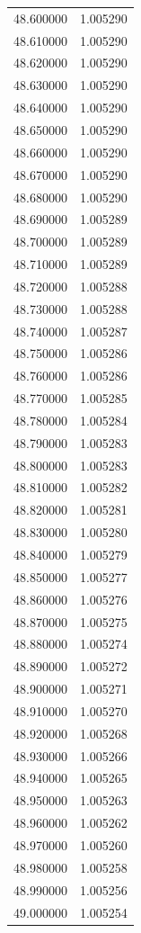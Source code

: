 \begin{tabular}{rr}
48.600000 & 1.005290 \\
48.610000 & 1.005290 \\
48.620000 & 1.005290 \\
48.630000 & 1.005290 \\
48.640000 & 1.005290 \\
48.650000 & 1.005290 \\
48.660000 & 1.005290 \\
48.670000 & 1.005290 \\
48.680000 & 1.005290 \\
48.690000 & 1.005289 \\
48.700000 & 1.005289 \\
48.710000 & 1.005289 \\
48.720000 & 1.005288 \\
48.730000 & 1.005288 \\
48.740000 & 1.005287 \\
48.750000 & 1.005286 \\
48.760000 & 1.005286 \\
48.770000 & 1.005285 \\
48.780000 & 1.005284 \\
48.790000 & 1.005283 \\
48.800000 & 1.005283 \\
48.810000 & 1.005282 \\
48.820000 & 1.005281 \\
48.830000 & 1.005280 \\
48.840000 & 1.005279 \\
48.850000 & 1.005277 \\
48.860000 & 1.005276 \\
48.870000 & 1.005275 \\
48.880000 & 1.005274 \\
48.890000 & 1.005272 \\
48.900000 & 1.005271 \\
48.910000 & 1.005270 \\
48.920000 & 1.005268 \\
48.930000 & 1.005266 \\
48.940000 & 1.005265 \\
48.950000 & 1.005263 \\
48.960000 & 1.005262 \\
48.970000 & 1.005260 \\
48.980000 & 1.005258 \\
48.990000 & 1.005256 \\
49.000000 & 1.005254 \\

\end{tabular}
